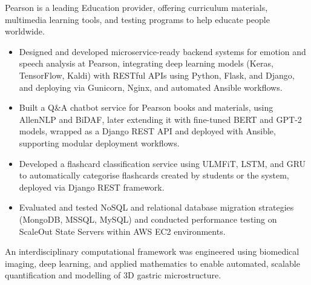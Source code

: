 \documentclass[12pt,a4paper,withhyper]{altacv}
\begin{document}
\divider{}

Pearson is a leading Education provider, offering curriculum materials, multimedia learning tools, and testing programs to help educate people worldwide.
\medskip
\begin{itemize}
    \item Designed and developed microservice-ready backend systems for emotion and speech analysis at Pearson, integrating deep learning models (Keras, TensorFlow, Kaldi) with RESTful APIs using Python, Flask, and Django, and deploying via Gunicorn, Nginx, and automated Ansible workflows.

    \item Built a Q\&A chatbot service for Pearson books and materials, using AllenNLP and BiDAF, later extending it with fine-tuned BERT and GPT-2 models, wrapped as a Django REST API and deployed with Ansible, supporting modular deployment workflows.

    \item Developed a flashcard classification service using ULMFiT, LSTM, and GRU to automatically categorise flashcards created by students or the system, deployed via Django REST framework.

    \item Evaluated and tested NoSQL and relational database migration strategies (MongoDB, MSSQL, MySQL) and conducted performance testing on ScaleOut State Servers within AWS EC2 environments.

\end{itemize}

\medskip



An interdisciplinary computational framework was engineered using biomedical imaging, deep learning, and applied mathematics to enable automated, scalable quantification and modelling of 3D gastric microstructure.
\end{document}
